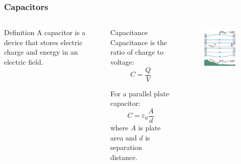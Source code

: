 \documentclass{beamer}
\begin{document}
\begin{frame}
    \frametitle{Capacitors}
    \begin{columns}
        \begin{block}{Definition}
            A capacitor is a device that stores electric charge and energy in an electric field.
        \end{block}
        
        \begin{block}{Capacitance}
            Capacitance is the ratio of charge to voltage:
            \begin{equation}
                C = \frac{Q}{V}
            \end{equation}
            
            For a parallel plate capacitor:
            \begin{equation}
                C = \varepsilon_0 \frac{A}{d}
            \end{equation}
            where $A$ is plate area and $d$ is separation distance.
        \end{block}
        
        \begin{alertblock}{ }
            \begin{figure}
                \centering
                \includegraphics[width=1\linewidth]{earthcap.png}
            \end{figure}
        \end{alertblock}
    \end{columns}
\end{frame}
\end{document}
